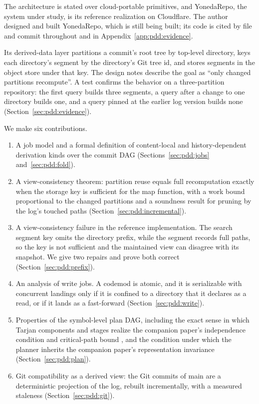 \documentclass[11pt,letterpaper]{article}
\theoremstyle{definition}
\theoremstyle{remark}
\begin{document}
The architecture is stated over cloud-portable primitives, and YonedaRepo, the system under study, is its reference realization on Cloudflare. The author designed and built YonedaRepo, which is still being built; its code is cited by file and commit throughout and in Appendix~\ref{app:pdd:evidence}.

Its derived-data layer partitions a commit's root tree by top-level directory, keys each directory's segment by the directory's Git tree id, and stores segments in the object store under that key. The design notes describe the goal as ``only changed partitions recompute''. A test confirms the behavior on a three-partition repository: the first query builds three segments, a query after a change to one directory builds one, and a query pinned at the earlier log version builds none (Section~\ref{sec:pdd:evidence}).

We make six contributions.
\begin{enumerate}
\item A job model and a formal definition of content-local and history-dependent derivation kinds over the commit DAG (Sections~\ref{sec:pdd:jobs} and~\ref{sec:pdd:fold}).
\item A view-consistency theorem: partition reuse equals full recomputation exactly when the storage key is sufficient for the map function, with a work bound proportional to the changed partitions and a soundness result for pruning by the log's touched paths (Section~\ref{sec:pdd:incremental}).
\item A view-consistency failure in the reference implementation. The search segment key omits the directory prefix, while the segment records full paths, so the key is not sufficient and the maintained view can disagree with its snapshot. We give two repairs and prove both correct (Section~\ref{sec:pdd:prefix}).
\item An analysis of write jobs. A codemod is atomic, and it is serializable with concurrent landings only if it is confined to a directory that it declares as a read, or if it lands as a fast-forward (Section~\ref{sec:pdd:write}).
\item Properties of the symbol-level plan DAG, including the exact sense in which Tarjan components and stages realize the companion paper's independence condition and critical-path bound \cite{long2026inversion}, and the condition under which the planner inherits the companion paper's representation invariance (Section~\ref{sec:pdd:plan}).
\item Git compatibility as a derived view: the Git commits of main are a deterministic projection of the log, rebuilt incrementally, with a measured staleness (Section~\ref{sec:pdd:git}).
\end{enumerate}
\end{document}
